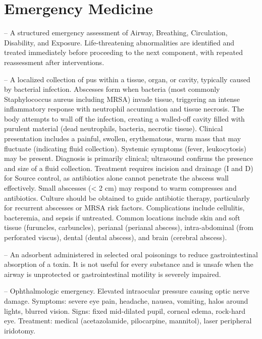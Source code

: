 \chapter{Emergency Medicine}

-- A structured emergency assessment of Airway, Breathing, Circulation, Disability, and Exposure. Life-threatening abnormalities are identified and treated immediately before proceeding to the next component, with repeated reassessment after interventions.

-- A localized collection of pus within a tissue, organ, or cavity, typically caused by bacterial infection. Abscesses form when bacteria (most commonly Staphylococcus aureus including MRSA) invade tissue, triggering an intense inflammatory response with neutrophil accumulation and tissue necrosis. The body attempts to wall off the infection, creating a walled-off cavity filled with purulent material (dead neutrophils, bacteria, necrotic tissue). Clinical presentation includes a painful, swollen, erythematous, warm mass that may fluctuate (indicating fluid collection). Systemic symptoms (fever, leukocytosis) may be present. Diagnosis is primarily clinical; ultrasound confirms the presence and size of a fluid collection. Treatment requires incision and drainage (I and D) for Source control, as antibiotics alone cannot penetrate the abscess wall effectively. Small abscesses (< 2 cm) may respond to warm compresses and antibiotics. Culture should be obtained to guide antibiotic therapy, particularly for recurrent abscesses or MRSA risk factors. Complications include cellulitis, bacteremia, and sepsis if untreated. Common locations include skin and soft tissue (furuncles, carbuncles), perianal (perianal abscess), intra-abdominal (from perforated viscus), dental (dental abscess), and brain (cerebral abscess).

-- An adsorbent administered in selected oral poisonings to reduce gastrointestinal absorption of a toxin. It is not useful for every substance and is unsafe when the airway is unprotected or gastrointestinal motility is severely impaired.

-- Ophthalmologic emergency. Elevated intraocular pressure causing optic nerve damage. Symptoms: severe eye pain, headache, nausea, vomiting, halos around lights, blurred vision. Signs: fixed mid-dilated pupil, corneal edema, rock-hard eye. Treatment: medical (acetazolamide, pilocarpine, mannitol), laser peripheral iridotomy.


